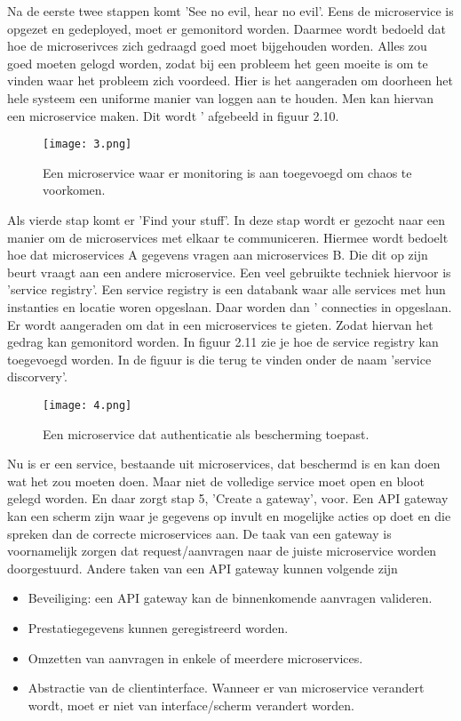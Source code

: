 Na de eerste twee stappen komt 'See no evil, hear no evil'. Eens de microservice is opgezet en gedeployed, moet er gemonitord worden. Daarmee wordt bedoeld dat hoe de microserivces zich gedraagd goed moet bijgehouden worden. Alles zou goed moeten gelogd worden, zodat bij een probleem het geen moeite is om te vinden waar het probleem zich voordeed. Hier is het aangeraden om doorheen het hele systeem een uniforme manier van loggen aan te houden. Men kan hiervan een microservice maken. Dit wordt ' afgebeeld in figuur 2.10.
\begin{figure}[h]
	\texttt{[image: 3.png]}
	\caption{Een microservice waar er monitoring is aan toegevoegd om chaos te voorkomen. \textcite{Benetis2016}}
	\centering
\end{figure}

Als vierde stap komt er 'Find your stuff'. In deze stap wordt er gezocht naar een manier om de microservices met elkaar te communiceren. Hiermee wordt bedoelt hoe dat microservices A gegevens vragen aan microservices B. Die dit op zijn beurt vraagt aan  een andere microservice. Een veel gebruikte techniek hiervoor is 'service registry'. Een service registry is een databank waar alle services met hun instanties en locatie woren opgeslaan. Daar worden dan ' connecties in opgeslaan. Er wordt aangeraden om dat in een microservices te gieten. Zodat hiervan het gedrag kan gemonitord worden. In figuur 2.11 zie je hoe de service registry kan toegevoegd worden. In de figuur is die terug te vinden onder de naam 'service discorvery'.
\begin{figure}[h]
	\texttt{[image: 4.png]}
	\caption{Een microservice dat authenticatie als bescherming toepast. \textcite{Benetis2016}}
	\centering
\end{figure}

Nu is er een service, bestaande uit microservices, dat beschermd is en kan doen wat het zou moeten doen. Maar niet de  volledige service moet open en bloot gelegd worden. En daar zorgt stap 5, 'Create a gateway', voor. Een API gateway kan een scherm zijn waar je gegevens op invult en mogelijke acties op doet en die spreken dan de correcte microservices aan. De taak van een gateway is voornamelijk zorgen dat request/aanvragen naar de juiste microservice worden doorgestuurd. Andere taken van een API gateway kunnen volgende zijn
\begin{itemize}
	\item Beveiliging: een API gateway kan de binnenkomende aanvragen valideren. 
	\item Prestatiegegevens kunnen geregistreerd worden.
	\item Omzetten van aanvragen in enkele of meerdere microservices.
	\item Abstractie van de clientinterface. Wanneer er van microservice verandert wordt, moet er niet van interface/scherm verandert worden. 
\end{itemize}

